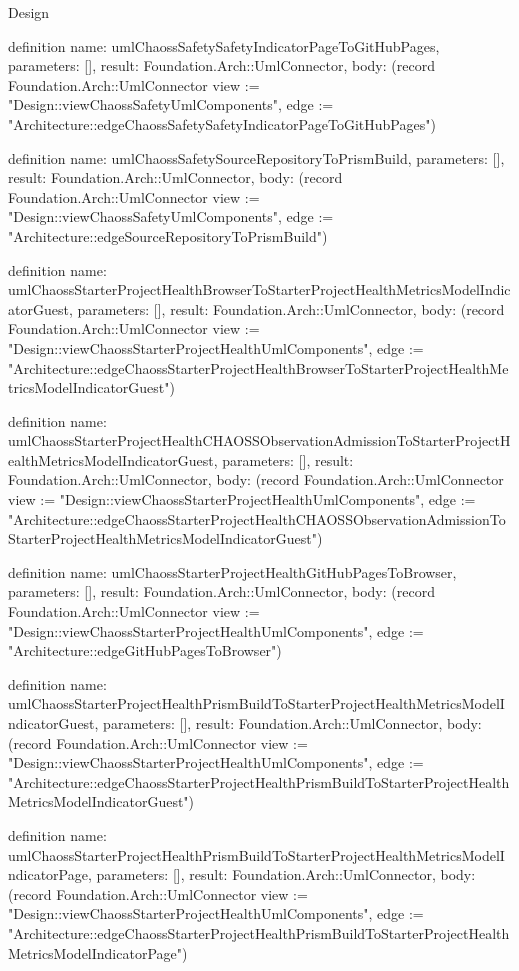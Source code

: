 \begin{lexlean}{Design}
\begin{semanticmodule}
definition{
  name: umlChaossSafetySafetyIndicatorPageToGitHubPages,
  parameters: [],
  result: Foundation.Arch::UmlConnector,
  body: (record Foundation.Arch::UmlConnector {view := "Design::viewChaossSafetyUmlComponents", edge := "Architecture::edgeChaossSafetySafetyIndicatorPageToGitHubPages"})
}

definition{
  name: umlChaossSafetySourceRepositoryToPrismBuild,
  parameters: [],
  result: Foundation.Arch::UmlConnector,
  body: (record Foundation.Arch::UmlConnector {view := "Design::viewChaossSafetyUmlComponents", edge := "Architecture::edgeSourceRepositoryToPrismBuild"})
}

definition{
  name: umlChaossStarterProjectHealthBrowserToStarterProjectHealthMetricsModelIndicatorGuest,
  parameters: [],
  result: Foundation.Arch::UmlConnector,
  body: (record Foundation.Arch::UmlConnector {view := "Design::viewChaossStarterProjectHealthUmlComponents", edge := "Architecture::edgeChaossStarterProjectHealthBrowserToStarterProjectHealthMetricsModelIndicatorGuest"})
}

definition{
  name: umlChaossStarterProjectHealthCHAOSSObservationAdmissionToStarterProjectHealthMetricsModelIndicatorGuest,
  parameters: [],
  result: Foundation.Arch::UmlConnector,
  body: (record Foundation.Arch::UmlConnector {view := "Design::viewChaossStarterProjectHealthUmlComponents", edge := "Architecture::edgeChaossStarterProjectHealthCHAOSSObservationAdmissionToStarterProjectHealthMetricsModelIndicatorGuest"})
}

definition{
  name: umlChaossStarterProjectHealthGitHubPagesToBrowser,
  parameters: [],
  result: Foundation.Arch::UmlConnector,
  body: (record Foundation.Arch::UmlConnector {view := "Design::viewChaossStarterProjectHealthUmlComponents", edge := "Architecture::edgeGitHubPagesToBrowser"})
}

definition{
  name: umlChaossStarterProjectHealthPrismBuildToStarterProjectHealthMetricsModelIndicatorGuest,
  parameters: [],
  result: Foundation.Arch::UmlConnector,
  body: (record Foundation.Arch::UmlConnector {view := "Design::viewChaossStarterProjectHealthUmlComponents", edge := "Architecture::edgeChaossStarterProjectHealthPrismBuildToStarterProjectHealthMetricsModelIndicatorGuest"})
}

definition{
  name: umlChaossStarterProjectHealthPrismBuildToStarterProjectHealthMetricsModelIndicatorPage,
  parameters: [],
  result: Foundation.Arch::UmlConnector,
  body: (record Foundation.Arch::UmlConnector {view := "Design::viewChaossStarterProjectHealthUmlComponents", edge := "Architecture::edgeChaossStarterProjectHealthPrismBuildToStarterProjectHealthMetricsModelIndicatorPage"})
}


\end{semanticmodule}
\end{lexlean}
